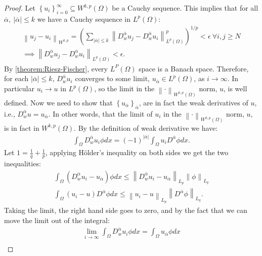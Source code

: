 \documentclass[../Main/main.tex]{subfiles}
\begin{document}
	\begin{proof}
		Let $\left \{  u_i\right \}_{i=0}^{\infty} \subseteq W^{k,p}(\Omega)$ be a Cauchy sequence. This implies that for all $\overline{\alpha}, \  |\overline{\alpha}| \leq k$ we have a Cauchy sequence in $L^p(\Omega)$:
		\begin{gather*}
			\left \| u_j -u_i \right \|_{W^{k,p}} =
			(\sum_{|\overline{\alpha}|\leq k} \left \| D_w^{\overline{\alpha}}u_j - D_w^{\overline{\alpha}}u_i \right \|_{L^p(\Omega)}^p)^{1/p}  < \epsilon \ \forall i,j \geq N \\
			\implies \left \| D_w^{\overline{\alpha}}u_j - D_w^{\overline{\alpha}}u_i \right \|_{L^p(\Omega)} < \epsilon.
		\end{gather*}
		By \eqref{theorem:Riesz-Fischer}, every $L^P(\Omega)$ space is a Banach space. Therefore, for each $|\overline{\alpha}| \leq k$, $D_w^{\overline{\alpha}}u_i $ converges to some limit, $ u_{\overline{\alpha}}\in L^p(\Omega)$, as $i\rightarrow  \infty$. In particular $u_i \rightarrow u$ in  $L^p(\Omega)$, so the limit in the $\left \|\cdot \right \|_{W^{k,p}(\Omega)}$ norm, $u$, is well defined. Now we need to show that $\left \{ u_{\overline{\alpha}} \right \}_{\overline{\alpha}}$, are in fact the weak derivatives of $u$, i.e., $D_w^{\overline{\alpha}}u =  u_{\overline{\alpha}}$. In other words, that the limit of $u_i$ in the $\left \|\cdot \right \|_{W^{k,p}(\Omega)}$ norm, $u$, is in fact in $W^{k,p}(\Omega)$. By the definition of weak derivative we have:
		\begin{gather*}
			\int_{\Omega} D_w^{\overline{\alpha}}u_i \phi dx = (-1)^{|\overline{\alpha}|} \int_{\Omega} u_i D^{\overline{\alpha}}\phi dx.
		\end{gather*}
		Let $1=\frac{1}{q}+\frac{1}{p}$, applying Hölder's inequality on both sides we get the two inequalities:
		\begin{gather*}
			\int_{\Omega} (D_w^{\overline{\alpha}}u_i - u_{\overline{\alpha}}) \phi dx \leq \left \| D_w^{\overline{\alpha}}u_i - u_{\overline{\alpha}} \right \|_{L_p} \left \| \phi \right \|_{L_q} \\
			\int_{\Omega} (u_i -u) D^{\overline{\alpha}}\phi dx \leq \left \|u_i -u  \right \|_{L_p} \left \| D^{\overline{\alpha}}\phi \right \|_{L_q}.
		\end{gather*}
		Taking the limit, the right hand side goes to zero, and by the fact that we can move the limit out of the integral:
		\begin{gather*}
			\lim_{i\rightarrow \infty} \int_{\Omega} D_w^{\overline{\alpha}}u_i \phi dx =  \int_{\Omega}u_{\overline{\alpha}} \phi dx \\

\end{gather*}
\end{proof}
\end{document}

